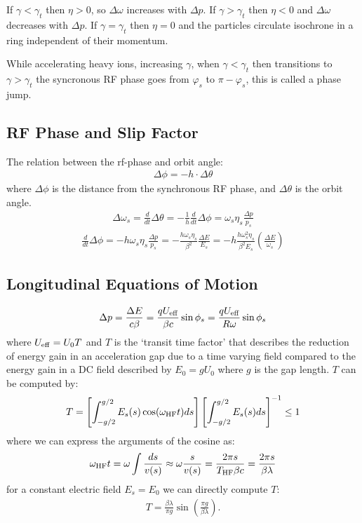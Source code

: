 \documentclass{article}
\numberwithin{equation}{section}
\begin{document}
If $\gamma < \gamma_t$ then $\eta > 0$, so $\Delta \omega $ increases with $\Delta p$. If $\gamma > \gamma_t$ then $\eta < 0$ and $\Delta \omega $ decreases with $\Delta p$. If $\gamma = \gamma_t$ then $\eta=0$ and the particles circulate isochrone in a ring independent of their momentum.


While accelerating heavy ions, increasing $\gamma$, when $\gamma < \gamma_t$ then transitions to $\gamma > \gamma_t$ the syncronous RF phase goes from $\varphi_s$ to $\pi - \varphi_s$, this is called a phase jump.


\subsection{ RF Phase and Slip Factor }
The relation between the rf-phase and orbit angle:
\begin{align}
\Delta \phi = - h \cdot \Delta \theta
\end{align}
where $\Delta \phi$ is the distance from the synchronous RF phase, and $\Delta \theta$ is the orbit angle.
\begin{align}
\Delta \omega_s = \frac{d}{dt} \Delta \theta = - \frac{1}{h} \frac{d}{dt} \Delta \phi = \omega_s \eta_s \frac{\Delta p}{p_s}
\end{align}
\begin{align}
\frac{d}{dt} \Delta \phi = - h \omega_s \eta_s \frac{\Delta p}{p_s} = - \frac{h \omega_s \eta_s}{\beta^2} \frac{\Delta E}{E_s} = - h \frac{h \omega_s^2 \eta_s}{\beta^2 E_s} \left( \frac{\Delta E}{\omega_s} \right)
\end{align}

\subsection{Longitudinal Equations of Motion}
\begin{align}
\Delta p = \frac{\Delta E}{c \beta} = \frac{q U_{\rm eff}}{\beta c} \sin \phi_s = \frac{q U_{\rm eff}}{R \omega} \sin \phi_s
\end{align}
where $U_{\rm eff} = U_0 T$ and $T$ is the `transit time factor' that describes the reduction of energy gain in an acceleration gap due to a time varying field compared to the energy gain in a DC field  described by $E_0 = g U_0$ where $g$ is the gap length. $T$ can be computed by:
\begin{align}
T = \left[ \int_{-g/2}^{g/2} E_s(s) \cos(\omega_{\rm HF} t ) ds \right] \left[ \int_{-g/2}^{g/2} E_s(s) ds \right]^{-1} \leq 1
\end{align}
where we can express the arguments of the cosine as:
\begin{align}
\omega_{\rm HF} t = \omega \int \frac{ds}{v(s)} \approx \omega \frac{s}{v(s)} = \frac{2 \pi s}{T_{\rm HF} \beta c} = \frac{2 \pi s}{\beta \lambda}
\end{align}
for a constant electric field $E_s = E_0$ we can directly compute $T$:
\begin{align}
T = \frac{\beta \lambda}{\pi g} \sin \left( \frac{\pi g}{\beta \lambda} \right).
\end{align}
\end{document}
